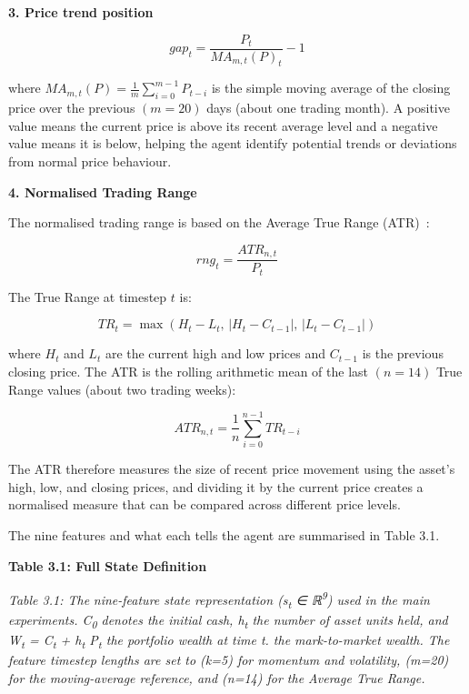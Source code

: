 \textbf{3. Price trend position}

\[gap_{t} = \frac{P_{t}}{MA_{m,t}(P)_{t}} - 1\]

where \({MA}_{m,t}(P) = \frac{1}{m}\sum_{i = 0}^{m - 1}P_{t - i}\) is
the simple moving average of the closing price over the previous
\((m = 20)\) days (about one trading month). A positive value means the
current price is above its recent average level and a negative value
means it is below, helping the agent identify potential trends or
deviations from normal price behaviour.

\textbf{4. Normalised Trading Range}

The normalised trading range is based on the Average True Range
(ATR)~\cite{wilder1978}:

\[rng_{t} = \frac{ATR_{n,t}}{P_{t}}\]

The True Range at timestep \(t\) is:

\[TR_{t} = \max\left( H_{t} - L_{t},\,\left| H_{t} - C_{t - 1} \right|,\,\left| L_{t} - C_{t - 1} \right| \right)\]

where \(H_{t}\) and \(L_{t}\) are the current high and low prices and
\(C_{t - 1}\) is the previous closing price. The ATR is the rolling
arithmetic mean of the last \((n = 14)\) True Range values (about two
trading weeks):

\[ATR_{n,t} = \frac{1}{n}\sum_{i = 0}^{n - 1}TR_{t - i}\]

The ATR therefore measures the size of recent price movement using the
asset's high, low, and closing prices, and dividing it by the current
price creates a normalised measure that can be compared across different
price levels.

The nine features and what each tells the agent are
summarised in Table 3.1.

\textbf{Table 3.1: Full State Definition}

\emph{Table 3.1: The} \emph{nine-feature state representation
(s\textsubscript{t} ∈ ℝ\textsuperscript{9}) used in the main
experiments. C\textsubscript{0} denotes the initial cash,
h\textsubscript{t} the number of asset units held, and
W\textsubscript{t} = C\textsubscript{t} + h\textsubscript{t}
P\textsubscript{t} the portfolio wealth at time t. the mark-to-market
wealth. The feature timestep lengths are set to (k=5) for momentum and
volatility, (m=20) for the moving-average reference, and (n=14) for the
Average True Range.}

